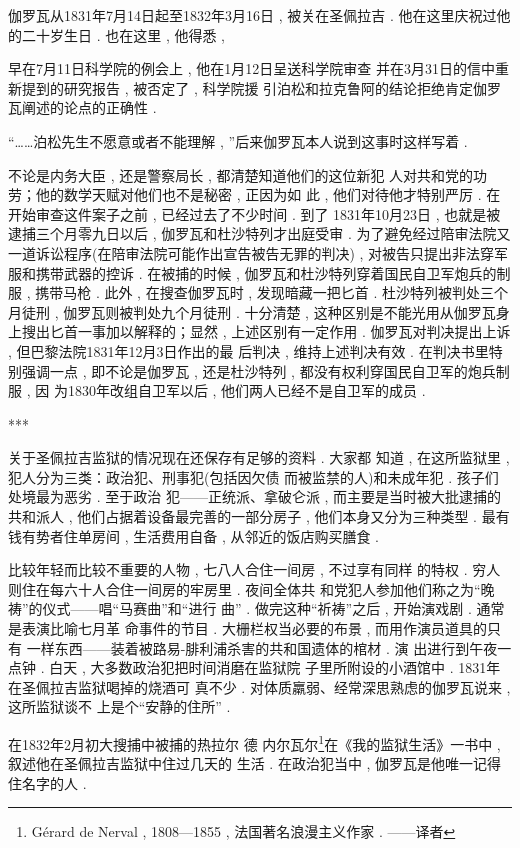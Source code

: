 伽罗瓦从1831年7月14日起至1832年3月16日 , 被关在圣佩拉吉 . 他在这里庆祝过他的二十岁生日 . 也在这里 , 他得悉 , 

早在7月11日科学院的例会上 , 他在1月12日呈送科学院审查 并在3月31日的信中重新提到的研究报告 , 被否定了 , 科学院援 引泊松和拉克鲁阿的结论拒绝肯定伽罗瓦阐述的论点的正确性 . 

“……泊松先生不愿意或者不能理解 , ”后来伽罗瓦本人说到这事时这样写着 . 

不论是内务大臣 , 还是警察局长 , 都清楚知道他们的这位新犯 人对共和党的功劳；他的数学天赋对他们也不是秘密 , 正因为如 此 , 他们对待他才特别严厉 . 在开始审查这件案子之前 , 已经过去了不少时间 . 到了 1831年10月23日 , 也就是被逮捕三个月零九日以后 , 伽罗瓦和杜沙特列才出庭受审 . 为了避免经过陪审法院又一道诉讼程序(在陪审法院可能作出宣告被告无罪的判决) , 对被告只提出非法穿军服和携带武器的控诉 . 在被捕的时候 , 伽罗瓦和杜沙特列穿着国民自卫军炮兵的制服 , 携带马枪 . 此外 , 在搜查伽罗瓦时 , 发现暗藏一把匕首 . 杜沙特列被判处三个月徒刑 , 伽罗瓦则被判处九个月徒刑 . 十分清楚 , 这种区别是不能光用从伽罗瓦身上搜出匕首一事加以解释的；显然 , 上述区别有一定作用 .  伽罗瓦对判决提出上诉 , 但巴黎法院1831年12月3日作出的最 后判决 , 维持上述判决有效 . 在判决书里特别强调一点 , 即不论是伽罗瓦 , 还是杜沙特列 , 都没有权利穿国民自卫军的炮兵制服 , 因 为1830年改组自卫军以后 , 他们两人已经不是自卫军的成员 . 

\begin{center}***
\end{center}

关于圣佩拉吉监狱的情况现在还保存有足够的资料 . 大家都 知道 , 在这所监狱里 , 犯人分为三类：政治犯、刑事犯(包括因欠债 而被监禁的人)和未成年犯 . 孩子们处境最为恶劣 . 至于政治 犯——正统派、拿破仑派 , 而主要是当时被大批逮捕的共和派人 ,  他们占据着设备最完善的一部分房子 , 他们本身又分为三种类型 .  最有钱有势者住单房间 , 生活费用自备 , 从邻近的饭店购买膳食 . 

比较年轻而比较不重要的人物 , 七八人合住一间房 , 不过享有同样 的特权 . 穷人则住在每六十人合住一间房的牢房里 . 夜间全体共 和党犯人参加他们称之为“晚祷”的仪式——唱“马赛曲”和“进行 曲” .  做完这种“祈祷”之后 , 开始演戏剧 . 通常是表演比喻七月革 命事件的节目 . 大栅栏权当必要的布景 , 而用作演员道具的只有 一样东西——装着被路易-腓利浦杀害的共和国遗体的棺材 . 演 出进行到午夜一点钟 . 白天 , 大多数政治犯把时间消磨在监狱院 子里所附设的小酒馆中 . 1831年在圣佩拉吉监狱喝掉的烧酒可 真不少 . 对体质羸弱、经常深思熟虑的伽罗瓦说来 , 这所监狱谈不 上是个“安静的住所” . 

在1832年2月初大搜捕中被捕的热拉尔 \textbullet 德 \textbullet 内尔瓦尔\footnote{Gérard de Nerval , 1808—1855 , 法国著名浪漫主义作家 . ——译者}在《我的监狱生活》一书中 , 叙述他在圣佩拉吉监狱中住过几天的 生活 . 在政治犯当中 , 伽罗瓦是他唯一记得住名字的人 . 

